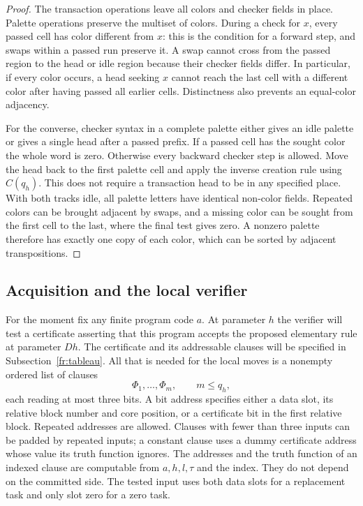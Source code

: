 \begin{proof}
The transaction operations leave all colors and checker fields in
place.  Palette operations preserve the multiset of colors.  During
a check for $x$, every passed cell has color different from $x$: this
is the condition for a forward step, and swaps within a passed run
preserve it.  A swap cannot cross from the passed region to the head
or idle region because their checker fields differ.  In particular,
if every color occurs, a head seeking $x$ cannot reach the last cell
with a different color after having passed all earlier cells.
Distinctness also prevents an equal-color adjacency.

For the converse, checker syntax in a complete palette either gives
an idle palette or gives a single head after a passed prefix.  If a
passed cell has the sought color the whole word is zero. Otherwise every
backward checker step is allowed.  Move the head back to the first
palette cell and apply the inverse creation rule using $C(q_h)$.
This does not require a transaction head to be in any specified
place.  With both tracks idle, all palette letters have identical
non-color fields.  Repeated colors can be brought adjacent by swaps,
and a missing color can be sought from the first cell to the last,
where the final test gives zero.  A nonzero palette therefore has
exactly one copy of each color, which can be sorted by adjacent
transpositions.
\end{proof}

\subsection{Acquisition and the local verifier}\label{fr:verifier}

For the moment fix any finite program code $a$.  At parameter $h$ the
verifier will test a certificate asserting that this program accepts
the proposed elementary rule at parameter $Dh$.  The certificate and
its addressable clauses will be specified in
Subsection~\ref{fr:tableau}.  All that is needed for the local moves
is a nonempty ordered list of clauses
\begin{equation}\label{fr:clause-list}
 \Phi_1,\ldots,\Phi_m,\qquad m\leq q_h,
\end{equation}
each reading at most three bits.  A bit address specifies either a
data slot, its relative block number and core position, or a
certificate bit in the first relative block.  Repeated addresses are
allowed.  Clauses with fewer than three inputs can be padded by
repeated inputs; a constant clause uses a dummy certificate address
whose value its truth function ignores.  The addresses and the truth function of an indexed
clause are computable from $a,h,l,\tau$ and the index.  They do not
depend on the committed side.  The tested input uses both data slots
for a replacement task and only slot zero for a zero task.

